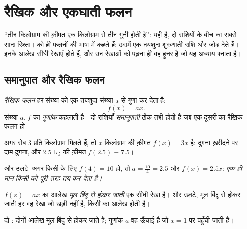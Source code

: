 \chapter{रैखिक और एकघाती फलन}\label{ch:g9:linfunc}

``तीन किलोग्राम की क़ीमत एक किलोग्राम से तीन गुनी होती है'': यही
 है, दो राशियों के बीच का सबसे सादा रिश्ता। 
 को ही फलनों की भाषा में कहते हैं;  उसमें एक तयशुदा
शुरुआती राशि और जोड़ देते हैं। इनके आलेख सीधी रेखाएँ होते हैं, और उन
रेखाओं को पढ़ना ही वह हुनर है जो यह अध्याय बनाता है।

\section{समानुपात और रैखिक फलन}

\begin{definition}[रैखिक फलन]\label{def:g9:linfunc:linear}
\emph{रैखिक फलन} हर संख्या को एक तयशुदा संख्या $a$
से गुणा कर देता है:
\[
f(x) = a x .
\]
संख्या $a$, $f$ का \emph{गुणांक} कहलाती है। दो राशियाँ
\emph{समानुपाती} ठीक तभी होती हैं जब एक दूसरी का
रैखिक फलन हो।
\end{definition}

\begin{example}\label{ex:g9:linfunc:linear}
अगर सेब $3$ प्रति किलोग्राम मिलते हैं, तो $x$ किलोग्राम की क़ीमत
$f(x) = 3x$ है: दुगना ख़रीदने पर दाम दुगना, और $2.5$ kg की क़ीमत
$f(2.5) = 7.5$।

और उलटे, अगर किसी  के लिए $f(4) = 10$ हो, तो
$a = \frac{10}{4} = 2.5$ और $f(x) = 2.5x$: \emph{एक ही मान किसी  को पूरी तरह तय कर देता है।}
\end{example}

\begin{proposition}[रैखिक फलन का आलेख]\label{prop:g9:linfunc:lineargraph}
$f(x) = ax$ का आलेख \emph{मूल बिंदु से होकर जाती} एक सीधी रेखा है। और
उलटे, मूल बिंदु से होकर जाती हर वह रेखा जो खड़ी नहीं है, किसी  का आलेख होती है।
\end{proposition}
\admitted

\begin{omfigure}

{\small दो : दोनों आलेख मूल बिंदु से होकर जाते हैं; गुणांक
$a$ वह ऊँचाई है जो $x = 1$ पर पहुँची जाती है।}
\end{omfigure}

